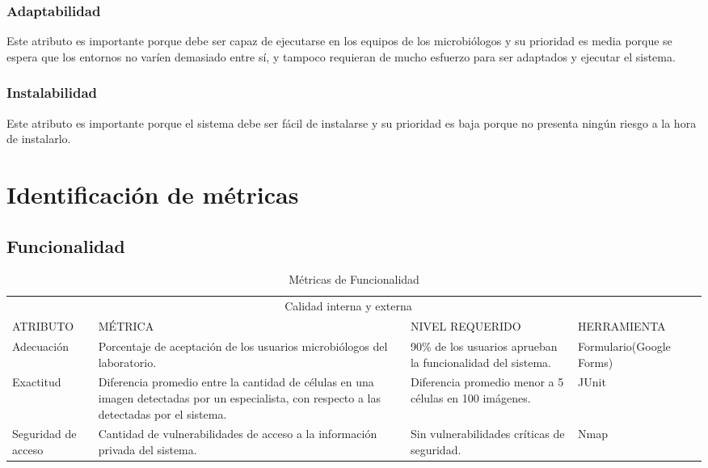 \documentclass[12pt]{article}
\begin{document}
\subsubsection{Adaptabilidad}
\vspace*{0.2in}
Este atributo es importante porque debe ser capaz de ejecutarse en los equipos de los microbiólogos y su prioridad es media porque se espera que los entornos no varíen demasiado entre sí, y tampoco requieran de mucho esfuerzo para ser adaptados y ejecutar el sistema.
\subsubsection{Instalabilidad }
\vspace*{0.2in}
Este atributo es importante porque el sistema debe ser fácil de instalarse  y su prioridad es baja porque no presenta ningún riesgo a la hora de instalarlo.\\[4 cm]

\vspace*{0.9in}

\section{Identificación de métricas}%

\subsection{Funcionalidad}%

\vspace*{0.3in}
\begin{table}[htb]%
\centering
\begin{tabular}{|p{4cm}|p{4cm}|p{4cm}|p{4cm}|p{4cm}|}
\hline
\multicolumn{4}{|c|}{Calidad interna y externa   } \\
\cline{1-4}
ATRIBUTO & MÉTRICA & NIVEL REQUERIDO & HERRAMIENTA\\
\hline \hline
Adecuación 
& Porcentaje de aceptación de los usuarios microbiólogos del laboratorio. & 90\(\%\) de los usuarios aprueban la funcionalidad del sistema. 
& Formulario(Google Forms)\\ \cline{1-4}
\hline
Exactitud 
& Diferencia promedio entre la cantidad de células en una imagen detectadas por un especialista, con respecto a las detectadas por el sistema.
& Diferencia promedio menor a 5 células en 100 imágenes.
& JUnit\\ \cline{1-4}
\hline
Seguridad de acceso & Cantidad de vulnerabilidades de acceso a la información privada del sistema.
& Sin vulnerabilidades críticas de seguridad. 
& Nmap\\ \cline{1-4}
\hline
\end{tabular}
\caption{Métricas de Funcionalidad}
\label{tabla:final}
\end{table}%
\end{document}
